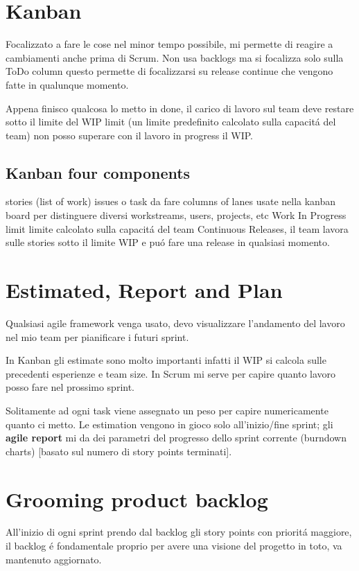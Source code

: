 \begin{itemize}
\section{Kanban}
Focalizzato a fare le cose nel minor tempo possibile, mi permette di reagire 
a cambiamenti anche prima di Scrum. Non usa backlogs ma si focalizza solo 
sulla ToDo column questo permette di focalizzarsi su release continue che 
vengono fatte in qualunque momento.

Appena finisco qualcosa lo metto in done, il carico di lavoro sul team 
deve restare sotto il limite del WIP limit (un limite predefinito calcolato 
sulla capacit\'a del team) non posso superare con il lavoro in progress il 
WIP.

\subsection{Kanban four components}
stories (list of work) issues o task da fare
columns of lanes usate nella kanban board per distinguere diversi workstreams, users, projects, etc
Work In Progress limit limite calcolato sulla capacit\'a del team
Continuous Releases, il team lavora sulle stories sotto il limite WIP e pu\'o fare una release in qualsiasi momento.

\section{Estimated, Report and Plan}
Qualsiasi agile framework venga usato, devo visualizzare l'andamento del lavoro 
nel mio team per pianificare i futuri sprint.

In Kanban gli estimate sono molto importanti infatti il WIP si calcola sulle 
precedenti esperienze e team size. In Scrum mi serve per capire quanto lavoro 
posso fare nel prossimo sprint. 

Solitamente ad ogni task viene assegnato un peso per capire numericamente 
quanto ci metto. 
Le estimation vengono in gioco solo all'inizio/fine sprint; gli 
\textbf{agile report} mi da dei parametri del progresso dello sprint corrente 
(burndown charts) [basato sul numero di story points terminati].

\section{Grooming product backlog}
All'inizio di ogni sprint prendo dal backlog gli story points con priorit\'a maggiore,
il backlog \'e fondamentale proprio per avere una visione del progetto in toto, va mantenuto 
aggiornato.


\end{itemize}
